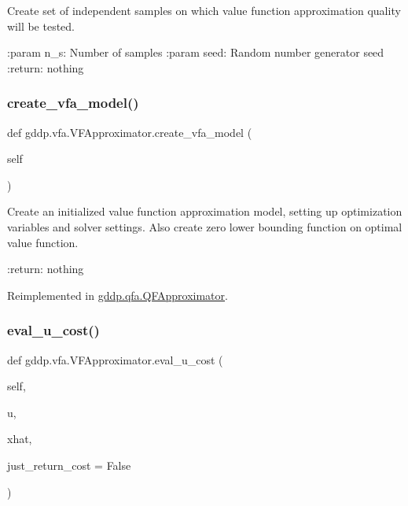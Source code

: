 \begin{DoxyVerb}Create set of independent samples on which value function approximation quality will be
tested.

:param n_s: Number of samples
:param seed: Random number generator seed
:return: nothing
\end{DoxyVerb}
 \mbox{\label{classgddp_1_1vfa_1_1_v_f_approximator_a612636b5857332f4798eab6dade1f729}} 
\subsubsection{\texorpdfstring{create\_vfa\_model()}{create\_vfa\_model()}}
{\footnotesize\ttfamily def gddp.\+vfa.\+V\+F\+Approximator.\+create\+\_\+vfa\+\_\+model (\begin{DoxyParamCaption}\item[{}]{self }\end{DoxyParamCaption})}

\begin{DoxyVerb}Create an initialized value function approximation model, setting up optimization
variables and solver settings. Also create zero lower bounding function on optimal value
function.

:return: nothing
\end{DoxyVerb}
 

Reimplemented in \mbox{\hyperlink{classgddp_1_1qfa_1_1_q_f_approximator_a955edba3bc147309cbc8d786e6cbc2db}{gddp.\+qfa.\+Q\+F\+Approximator}}.

\mbox{\label{classgddp_1_1vfa_1_1_v_f_approximator_afe4afaeb655002330027b925b77e8cc2}} 
\subsubsection{\texorpdfstring{eval\_u\_cost()}{eval\_u\_cost()}}
{\footnotesize\ttfamily def gddp.\+vfa.\+V\+F\+Approximator.\+eval\+\_\+u\+\_\+cost (\begin{DoxyParamCaption}\item[{}]{self,  }\item[{}]{u,  }\item[{}]{xhat,  }\item[{}]{just\+\_\+return\+\_\+cost = {\ttfamily False} }\end{DoxyParamCaption})}

